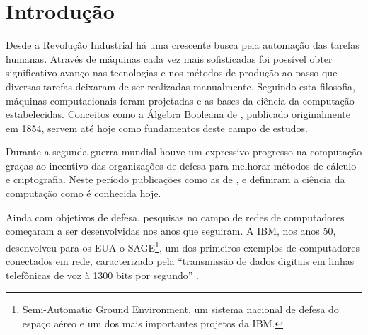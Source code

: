 \documentclass[twoside,english,brazilian]{UNISINOSmonografia}
\begin{document}
\chapter{Introdução}



	Desde a Revolução Industrial há uma crescente busca pela automação das 
	tarefas humanas. Através de máquinas cada vez mais sofisticadas foi 
	possível obter significativo avanço nas tecnologias e nos métodos de 
	produção ao passo que diversas tarefas deixaram de ser realizadas 
	manualmente.
	Seguindo esta filosofia, máquinas computacionais foram projetadas e as 
	bases da ciência da computação estabelecidas. Conceitos como a 
	Álgebra Booleana de , publicado originalmente em 
	1854, servem até hoje como fundamentos deste campo de estudos.

	Durante a segunda guerra mundial houve um expressivo progresso na 
	computação graças ao incentivo das organizações de defesa para melhorar 
	métodos de cálculo e criptografia. Neste período publicações como as de 
	,  e 
	 definiram a ciência da computação como é 
	conhecida hoje.

	Ainda com objetivos de defesa, pesquisas no campo de redes de computadores 
	começaram a ser desenvolvidas nos anos que seguiram. A IBM, nos anos 50,
	desenvolveu para os EUA o SAGE\footnote{Semi-Automatic Ground Environment, 
	um sistema nacional de defesa do espaço aéreo e um dos mais importantes 
	projetos da IBM. 
	}, 
	um dos primeiros exemplos de computadores conectados em rede, 
	caracterizado pela ``transmissão de dados digitais em linhas telefônicas 
	de voz à 1300 bits por segundo'' \cite{IBMSAGE1983}.
\end{document}
